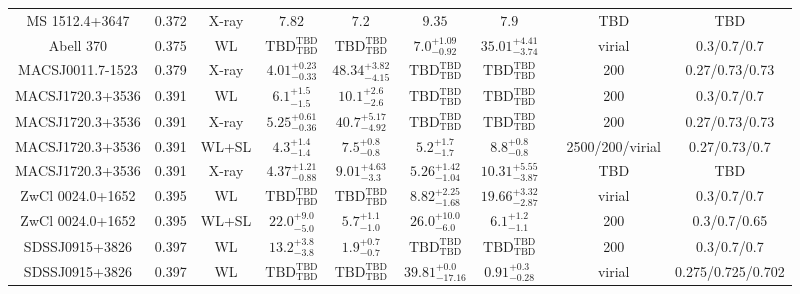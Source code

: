 \begin{table}
\begin{tabular}{cccccccccc}
MS 1512.4+3647 & 0.372 & X-ray & ${7.82}^{}_{}$ & ${7.2}^{}_{}$ & ${9.35}^{}_{}$ & ${7.9}^{}_{}$ & \citet{MO99.1} & TBD & TBD \\
Abell 370 & 0.375 & WL & ${\mathrm{TBD}}^{\mathrm{TBD}}_{\mathrm{TBD}}$ & ${\mathrm{TBD}}^{\mathrm{TBD}}_{\mathrm{TBD}}$ & ${7.0}^{+1.09}_{-0.92}$ & ${35.01}^{+4.41}_{-3.74}$ & \citet{UM11.1} & virial & 0.3/0.7/0.7 \\
MACSJ0011.7-1523 & 0.379 & X-ray & ${4.01}^{+0.23}_{-0.33}$ & ${48.34}^{+3.82}_{-4.15}$ & ${\mathrm{TBD}}^{\mathrm{TBD}}_{\mathrm{TBD}}$ & ${\mathrm{TBD}}^{\mathrm{TBD}}_{\mathrm{TBD}}$ & \citet{BA14.1} & 200 & 0.27/0.73/0.73 \\
MACSJ1720.3+3536 & 0.391 & WL & ${6.1}^{+1.5}_{-1.5}$ & ${10.1}^{+2.6}_{-2.6}$ & ${\mathrm{TBD}}^{\mathrm{TBD}}_{\mathrm{TBD}}$ & ${\mathrm{TBD}}^{\mathrm{TBD}}_{\mathrm{TBD}}$ & \citet{SE14.1} & 200 & 0.3/0.7/0.7 \\
MACSJ1720.3+3536 & 0.391 & X-ray & ${5.25}^{+0.61}_{-0.36}$ & ${40.7}^{+5.17}_{-4.92}$ & ${\mathrm{TBD}}^{\mathrm{TBD}}_{\mathrm{TBD}}$ & ${\mathrm{TBD}}^{\mathrm{TBD}}_{\mathrm{TBD}}$ & \citet{BA14.1} & 200 & 0.27/0.73/0.73 \\
MACSJ1720.3+3536 & 0.391 & WL+SL & ${4.3}^{+1.4}_{-1.4}$ & ${7.5}^{+0.8}_{-0.8}$ & ${5.2}^{+1.7}_{-1.7}$ & ${8.8}^{+0.8}_{-0.8}$ & \citet{ME14.1} & 2500/200/virial & 0.27/0.73/0.7 \\
MACSJ1720.3+3536 & 0.391 & X-ray & ${4.37}^{+1.21}_{-0.88}$ & ${9.01}^{+4.63}_{-3.3}$ & ${5.26}^{+1.42}_{-1.04}$ & ${10.31}^{+5.55}_{-3.87}$ & \citet{SC06.1} & TBD & TBD \\
ZwCl 0024.0+1652 & 0.395 & WL & ${\mathrm{TBD}}^{\mathrm{TBD}}_{\mathrm{TBD}}$ & ${\mathrm{TBD}}^{\mathrm{TBD}}_{\mathrm{TBD}}$ & ${8.82}^{+2.25}_{-1.68}$ & ${19.66}^{+3.32}_{-2.87}$ & \citet{UM11.1} & virial & 0.3/0.7/0.7 \\
ZwCl 0024.0+1652 & 0.395 & WL+SL & ${22.0}^{+9.0}_{-5.0}$ & ${5.7}^{+1.1}_{-1.0}$ & ${26.0}^{+10.0}_{-6.0}$ & ${6.1}^{+1.2}_{-1.1}$ & \citet{KN03.1} & 200 & 0.3/0.7/0.65 \\
SDSSJ0915+3826 & 0.397 & WL & ${13.2}^{+3.8}_{-3.8}$ & ${1.9}^{+0.7}_{-0.7}$ & ${\mathrm{TBD}}^{\mathrm{TBD}}_{\mathrm{TBD}}$ & ${\mathrm{TBD}}^{\mathrm{TBD}}_{\mathrm{TBD}}$ & \citet{SE14.1} & 200 & 0.3/0.7/0.7 \\
SDSSJ0915+3826 & 0.397 & WL & ${\mathrm{TBD}}^{\mathrm{TBD}}_{\mathrm{TBD}}$ & ${\mathrm{TBD}}^{\mathrm{TBD}}_{\mathrm{TBD}}$ & ${39.81}^{+0.0}_{-17.16}$ & ${0.91}^{+0.3}_{-0.28}$ & \citet{OG12.1} & virial & 0.275/0.725/0.702 \\

\end{tabular}
\end{table}
